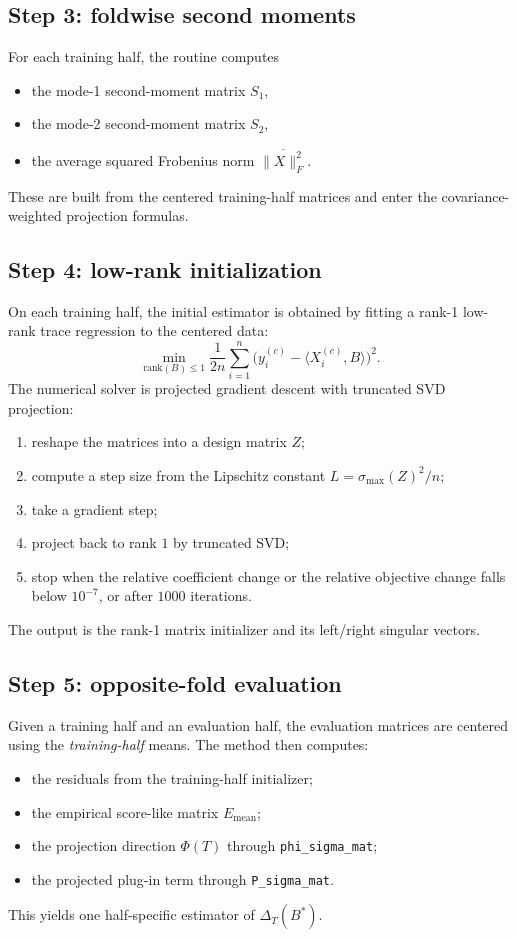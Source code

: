\documentclass[11pt]{article}
\begin{document}
\subsection*{Step 3: foldwise second moments}
For each training half, the routine computes
\begin{itemize}[leftmargin=2em]
    \item the mode-1 second-moment matrix \(S_1\),
    \item the mode-2 second-moment matrix \(S_2\),
    \item the average squared Frobenius norm \(\overline{\|X\|_F^2}\).
\end{itemize}
These are built from the centered training-half matrices and enter the covariance-weighted projection formulas.

\subsection*{Step 4: low-rank initialization}
On each training half, the initial estimator is obtained by fitting a rank-1 low-rank trace regression to the centered data:
\[
\min_{\mathrm{rank}(B)\le 1}
\frac{1}{2n}\sum_{i=1}^n \bigl(y_i^{(c)}-\langle X_i^{(c)},B\rangle\bigr)^2.
\]
The numerical solver is projected gradient descent with truncated SVD projection:
\begin{enumerate}[leftmargin=2em]
    \item reshape the matrices into a design matrix \(Z\);
    \item compute a step size from the Lipschitz constant \(L=\sigma_{\max}(Z)^2/n\);
    \item take a gradient step;
    \item project back to rank \(1\) by truncated SVD;
    \item stop when the relative coefficient change or the relative objective change falls below \(10^{-7}\), or after \(1000\) iterations.
\end{enumerate}
The output is the rank-1 matrix initializer and its left/right singular vectors.

\subsection*{Step 5: opposite-fold evaluation}
Given a training half and an evaluation half, the evaluation matrices are centered using the \emph{training-half} means. The method then computes:
\begin{itemize}[leftmargin=2em]
    \item the residuals from the training-half initializer;
    \item the empirical score-like matrix \(E_{\mathrm{mean}}\);
    \item the projection direction \(\Phi(T)\) through \texttt{phi\_sigma\_mat};
    \item the projected plug-in term through \texttt{P\_sigma\_mat}.
\end{itemize}
This yields one half-specific estimator of \(\Delta_T(B^\ast)\).
\end{document}
